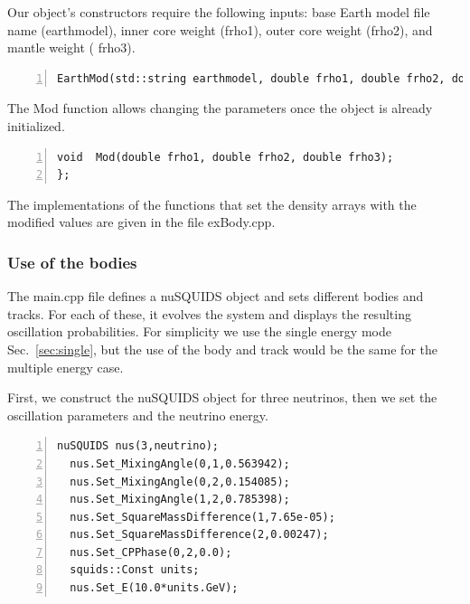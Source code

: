 \documentclass[3p,12pt]{elsarticle}
\newcommand{\ttf}{\ttfamily}
\begin{document}
Our object's constructors require the following inputs:
base Earth model file name ({\ttf earthmodel}), inner core weight
({\ttf frho1}), outer core weight ({\ttf frho2}), and mantle weight ({\ttf
  frho3}).

\begin{lstlisting}[frame=leftline, numbers = left,breaklines=true,label = ex:sin1,firstnumber=last]
  EarthMod(std::string earthmodel, double frho1, double frho2, double frho3);
\end{lstlisting}
The {\ttf Mod} function allows changing the parameters once the
object is already initialized.
\begin{lstlisting}[frame=leftline, numbers =
  left,breaklines=true,label = ex:sin1,firstnumber=last]
  void  Mod(double frho1, double frho2, double frho3);
};

\end{lstlisting}

The implementations of the functions that set the density arrays with
the modified values are given in the file {\ttf exBody.cpp}.

\subsubsection{Use of the bodies}

The {\ttf main.cpp} file defines a nuSQUIDS object and sets different bodies and
tracks. For each of these, it evolves the system and displays the resulting oscillation
probabilities.
For simplicity we use the single energy mode Sec.~\ref{sec:single}, but the use of the body
and track would be the same for the multiple energy case.

First, we construct the nuSQUIDS object for three neutrinos, then we set the
oscillation parameters and the neutrino energy.

\begin{lstlisting}[frame=leftline, numbers =
  left,breaklines=true,label = ex:sin1]
  nuSQUIDS nus(3,neutrino);
  nus.Set_MixingAngle(0,1,0.563942);
  nus.Set_MixingAngle(0,2,0.154085);
  nus.Set_MixingAngle(1,2,0.785398);
  nus.Set_SquareMassDifference(1,7.65e-05);
  nus.Set_SquareMassDifference(2,0.00247);
  nus.Set_CPPhase(0,2,0.0);
  squids::Const units;
  nus.Set_E(10.0*units.GeV);
\end{lstlisting}
\end{document}
